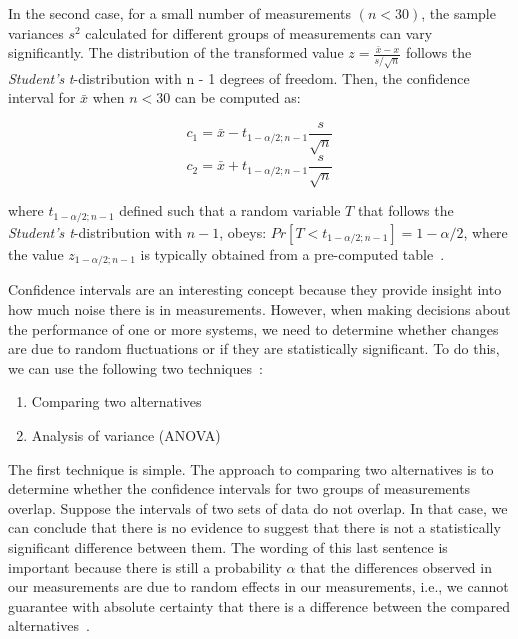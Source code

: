 In the second case, for a small number of measurements \((n < 30)\), the
sample variances \(s^2\) calculated for different groups of measurements can
vary significantly. The distribution of the transformed value \(z =
   \frac{\bar{x} - x}{s/\sqrt{n}}\) follows the \emph{Student's} \emph{t}-distribution
with n - 1 degrees of freedom. Then, the confidence interval for \(\bar{x}\)
when \(n < 30\) can be computed as:

\begin{equation}
c_1 = \bar{x} - t_{1-\alpha/2;n-1}\frac{s}{\sqrt{n}}
\end{equation}
\begin{equation}
c_2 = \bar{x} + t_{1-\alpha/2;n-1}\frac{s}{\sqrt{n}}
\end{equation}

where \(t_{1 - \alpha/2;n-1}\) defined such that a random variable \(T\) that
follows the \emph{Student's t}-distribution with \(n - 1\), obeys: \(Pr[T < t_{1 -
   \alpha/2;n - 1}] = 1 - \alpha/2\), where the value \(z_{1 - \alpha/2;n - 1}\)
is typically obtained from a pre-computed table~\cite{DBLP_conf_oopsla_GeorgesBE07,lilja2005measuring}.

Confidence intervals are an interesting concept because they provide insight into how much noise there is in measurements. However, when making decisions about the performance of one or more systems, we need to determine whether changes are due to random fluctuations or if they are statistically significant. To do this, we can use the following two techniques~\cite{DBLP_conf_oopsla_GeorgesBE07, lilja2005measuring}:

\begin{enumerate}
\item Comparing two alternatives
\item Analysis of variance (ANOVA)
\end{enumerate}

The first technique is simple. The approach to comparing two alternatives is to determine whether the confidence intervals for two groups of measurements overlap. Suppose the intervals of two sets of data do not overlap. In that case, we can conclude that there is no evidence to suggest that there is not a statistically significant difference between them. The wording of this last sentence is important because there is still a probability \(\alpha\) that the differences observed in our measurements are due to random effects in our measurements, i.e., we cannot guarantee with absolute certainty that there is a difference between the compared alternatives~\cite{DBLP_conf_oopsla_GeorgesBE07}.

